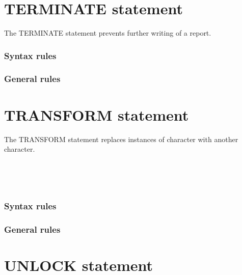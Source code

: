 \section{TERMINATE statement}

The TERMINATE statement prevents further writing of a report.

\begin{syntax}
\end{syntax}

\subsubsection{Syntax rules}

\subsubsection{General rules}

\section{TRANSFORM statement}

The TRANSFORM statement replaces instances of character with another character.

\begin{syntax}[\deletedcolour]
   \identifier {}
  \begin{1=}
    \identifier \\
    \literal
  \end{1=}
  \begin{1=}
    \identifier \\
    \literal
  \end{1=}
\end{syntax}

\subsubsection{Syntax rules}

\subsubsection{General rules}

\section{UNLOCK statement}

